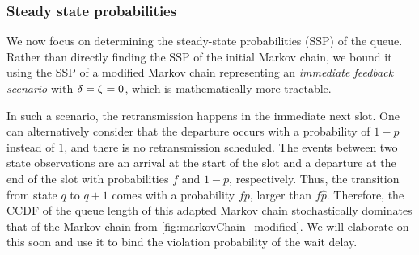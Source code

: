 \begin{figure*}[t]
\centering
{}
\caption{Markov chain with queue length as states as observed at the slot boundary for an ARQ scheme. The transition probabilities, except the self-loop probabilities, are shown.}
\label{fig:markovChain_modified}
\end{figure*}


\subsubsection{Steady state probabilities}
We now focus on determining the steady-state probabilities (SSP) of the queue. Rather than directly finding the SSP of the initial Markov chain, we bound it using the SSP of a modified Markov chain representing an \textit{immediate feedback scenario} with $\delta = {\zeta} = 0$, which is mathematically more tractable.

In such a scenario, the retransmission happens in the immediate next slot. One can alternatively consider that the departure occurs with a probability of $1-p$ instead of $1$, and there is no retransmission scheduled. 
The events between two state observations are an arrival at the start of the slot and a departure at the end of the slot with probabilities $f$ and $1-p$, respectively. 
Thus, the transition from state $q$ to $q+1$ comes with a probability $fp$, larger than $f\hat{p}$. 
Therefore, the CCDF of the queue length of this adapted Markov chain stochastically dominates that of the Markov chain from \ref{fig:markovChain_modified}. We will elaborate on this soon and use it to bind the violation probability of the wait delay. 

